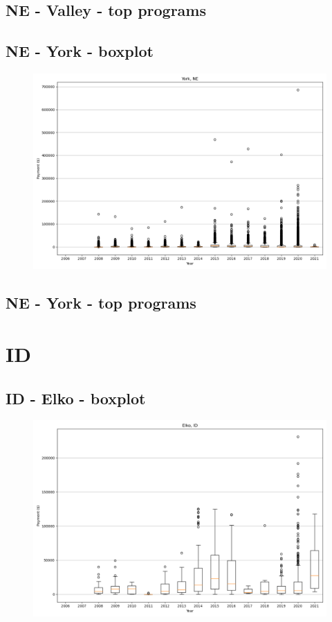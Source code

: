 \subsection*{NE - Valley - top programs}

\newpage
\subsection*{NE - York - boxplot}
\begin{figure}[h]
\centering
\includegraphics[width=7in]{../output/boxplots/counties/York-NE_boxplot.png}
\end{figure}


\subsection*{NE - York - top programs}

\newpage
\section*{ID}
\subsection*{ID - Elko - boxplot}
\begin{figure}[h]
\centering
\includegraphics[width=7in]{../output/boxplots/counties/Elko-ID_boxplot.png}
\end{figure}


